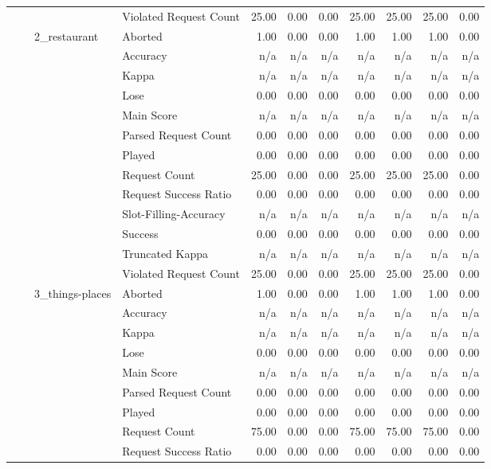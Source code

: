 \begin{tabular}{llllrrrrrrr}
 &  &  & Violated Request Count & 25.00 & 0.00 & 0.00 & 25.00 & 25.00 & 25.00 & 0.00 \\
\cline{3-11}
 &  & \multirow[t]{13}{*}{2_restaurant} & Aborted & 1.00 & 0.00 & 0.00 & 1.00 & 1.00 & 1.00 & 0.00 \\
 &  &  & Accuracy & n/a & n/a & n/a & n/a & n/a & n/a & n/a \\
 &  &  & Kappa & n/a & n/a & n/a & n/a & n/a & n/a & n/a \\
 &  &  & Lose & 0.00 & 0.00 & 0.00 & 0.00 & 0.00 & 0.00 & 0.00 \\
 &  &  & Main Score & n/a & n/a & n/a & n/a & n/a & n/a & n/a \\
 &  &  & Parsed Request Count & 0.00 & 0.00 & 0.00 & 0.00 & 0.00 & 0.00 & 0.00 \\
 &  &  & Played & 0.00 & 0.00 & 0.00 & 0.00 & 0.00 & 0.00 & 0.00 \\
 &  &  & Request Count & 25.00 & 0.00 & 0.00 & 25.00 & 25.00 & 25.00 & 0.00 \\
 &  &  & Request Success Ratio & 0.00 & 0.00 & 0.00 & 0.00 & 0.00 & 0.00 & 0.00 \\
 &  &  & Slot-Filling-Accuracy & n/a & n/a & n/a & n/a & n/a & n/a & n/a \\
 &  &  & Success & 0.00 & 0.00 & 0.00 & 0.00 & 0.00 & 0.00 & 0.00 \\
 &  &  & Truncated Kappa & n/a & n/a & n/a & n/a & n/a & n/a & n/a \\
 &  &  & Violated Request Count & 25.00 & 0.00 & 0.00 & 25.00 & 25.00 & 25.00 & 0.00 \\
\cline{3-11}
 &  & \multirow[t]{13}{*}{3_things-places} & Aborted & 1.00 & 0.00 & 0.00 & 1.00 & 1.00 & 1.00 & 0.00 \\
 &  &  & Accuracy & n/a & n/a & n/a & n/a & n/a & n/a & n/a \\
 &  &  & Kappa & n/a & n/a & n/a & n/a & n/a & n/a & n/a \\
 &  &  & Lose & 0.00 & 0.00 & 0.00 & 0.00 & 0.00 & 0.00 & 0.00 \\
 &  &  & Main Score & n/a & n/a & n/a & n/a & n/a & n/a & n/a \\
 &  &  & Parsed Request Count & 0.00 & 0.00 & 0.00 & 0.00 & 0.00 & 0.00 & 0.00 \\
 &  &  & Played & 0.00 & 0.00 & 0.00 & 0.00 & 0.00 & 0.00 & 0.00 \\
 &  &  & Request Count & 75.00 & 0.00 & 0.00 & 75.00 & 75.00 & 75.00 & 0.00 \\
 &  &  & Request Success Ratio & 0.00 & 0.00 & 0.00 & 0.00 & 0.00 & 0.00 & 0.00 \\

\end{tabular}
